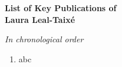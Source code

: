 \documentclass[10pt, oneside,english]{article}
\begin{document}
\begin{center}
{\huge{\bf List of Key Publications of \\ \vspace{0.1cm}
 Laura Leal-Taix{\'e}}}
\end{center}


\vspace{0.2cm}


\begin{center}
{\large{\it In chronological order}}
\end{center}

\vspace{1cm}


\begin{enumerate}


\item {}
\vspace{0.2cm}
abc


\vspace{0.6cm}






\end{enumerate}


\end{document}
